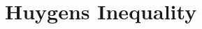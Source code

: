 \documentclass{subfile}
\begin{document}
	\section{Huygens Inequality}\label{sec:huygens}
\end{document}
